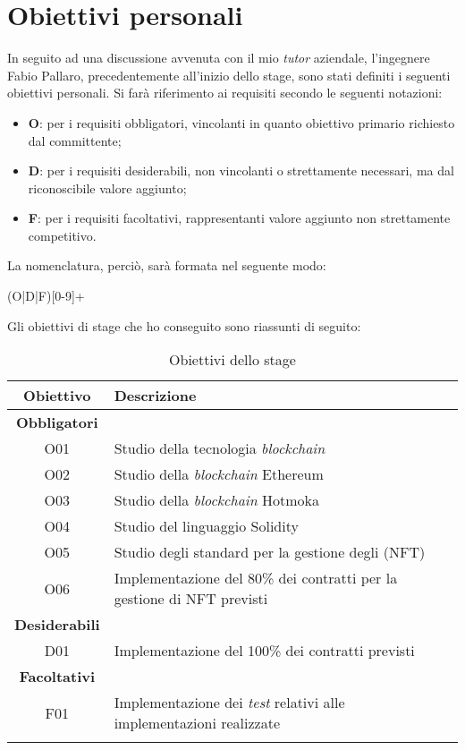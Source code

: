 \section{Obiettivi personali}
In seguito ad una discussione avvenuta con il mio \emph{tutor} aziendale, l'ingegnere Fabio Pallaro, precedentemente all'inizio dello stage, sono stati definiti i seguenti obiettivi personali. Si farà riferimento ai requisiti secondo le seguenti notazioni:
\begin{itemize}
  \item \textbf{O}: per i requisiti obbligatori, vincolanti in quanto obiettivo primario richiesto dal committente;
  \item \textbf{D}: per i requisiti desiderabili, non vincolanti o strettamente necessari, ma dal riconoscibile valore aggiunto;
  \item \textbf{F}: per i requisiti facoltativi, rappresentanti valore aggiunto non strettamente competitivo.
\end{itemize}

\noindent La nomenclatura, perciò, sarà formata nel seguente modo:
\begin{center}
  (O|D|F)[0-9]+
\end{center}

\noindent Gli obiettivi di stage che ho conseguito sono riassunti di seguito:
\begin{longtable}{|c|l|}  
  \hline

  \textbf{Obiettivo} & \textbf{Descrizione} \\ \hline

  \textbf{Obbligatori} & \\

  O01       & Studio della tecnologia \emph{blockchain} \\
  O02       & Studio della \emph{blockchain} Ethereum \\
  O03       & Studio della \emph{blockchain} Hotmoka \\ 
  O04       & Studio del linguaggio Solidity \\ 
  O05       & Studio degli standard per la gestione degli (NFT) \\ 
  O06       & Implementazione del 80\% dei contratti per la gestione di NFT previsti \\
  
  \hline

  \textbf{Desiderabili} &  \\
  
  D01       & Implementazione del 100\% dei contratti previsti \\

  \hline

  \textbf{Facoltativi} & \\

  F01       & Implementazione dei \emph{test} relativi alle implementazioni realizzate \\

  \hline

  \caption{Obiettivi dello stage}

\end{longtable}

